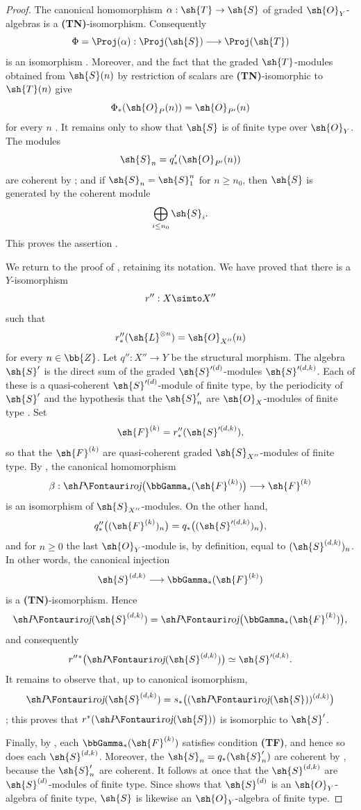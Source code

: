 \begin{proof}
The canonical homomorphism $\alpha:\sh{T}\to\sh{S}$ of graded $\sh{O}_Y$-algebras is a \textbf{(TN)}-isomorphism.
Consequently
\label{III.2.3.5.1}
\[
  \Phi=\Proj(\alpha):\Proj(\sh{S})\longrightarrow\Proj(\sh{T})
\]
is an isomorphism .
Moreover,  and the fact that the graded $\sh{T}$-modules obtained from $\sh{S}(n)$ by restriction of scalars are \textbf{(TN)}-isomorphic to $\sh{T}(n)$ give
\[
  \Phi_*(\sh{O}_P(n))=\sh{O}_{P'}(n)
\]
for every $n$ .
It remains only to show that $\sh{S}$ is of finite type over $\sh{O}_Y$.
The modules
\[
  \sh{S}_n=q'_*(\sh{O}_{P'}(n))
\]
are coherent by ; and if $\sh{S}_n=\sh{S}_1^n$ for $n\geq n_0$, then $\sh{S}$ is generated by the coherent module
\[
  \bigoplus_{i\leq n_0}\sh{S}_i.
\]
This proves the assertion .

We return to the proof of , retaining its notation.
We have proved that there is a $Y$-isomorphism
\[
  r'':X\simto X''
\]
such that
\[
  r''_*(\sh{L}^{\otimes n})=\sh{O}_{X''}(n)
\]
for every $n\in\bb{Z}$.
Let $q'':X''\to Y$ be the structural morphism.
The algebra $\sh{S}'$ is the direct sum of the graded $\sh{S}'^{(d)}$-modules $\sh{S}'^{(d,k)}$.
Each of these is a quasi-coherent $\sh{S}'^{(d)}$-module of finite type, by the periodicity of $\sh{S}'$ and the hypothesis that the $\sh{S}'_n$ are $\sh{O}_X$-modules of finite type .
Set
\[
  \sh{F}^{(k)}=r''_*(\sh{S}'^{(d,k)}),
\]
so that the $\sh{F}^{(k)}$ are quasi-coherent graded $\sh{S}_{X''}$-modules of finite type.
By , the canonical homomorphism
\[
  \beta:\shProj\bigl(\bbGamma_*(\sh{F}^{(k)})\bigr)
  \longrightarrow\sh{F}^{(k)}
\]
is an isomorphism of $\sh{S}_{X''}$-modules.
On the other hand,
\[
  q''_*\bigl((\sh{F}^{(k)})_n\bigr)
  =q_*\bigl((\sh{S}'^{(d,k)})_n\bigr),
\]
and for $n\geq0$ the last $\sh{O}_Y$-module is, by definition, equal to $(\sh{S}^{(d,k)})_n$.
In other words, the canonical injection
\[
  \sh{S}^{(d,k)}
  \longrightarrow\bbGamma_*(\sh{F}^{(k)})
\]
is a \textbf{(TN)}-isomorphism.
Hence
\[
  \shProj(\sh{S}^{(d,k)})
  =\shProj\bigl(\bbGamma_*(\sh{F}^{(k)})\bigr),
\]
and consequently
\[
  r''{}^*\bigl(\shProj(\sh{S}^{(d,k)})\bigr)
  \simeq\sh{S}'^{(d,k)}.
\]
It remains to observe that, up to canonical isomorphism,
\[
  \shProj(\sh{S}^{(d,k)})
  =s_*\bigl((\shProj(\sh{S}))^{(d,k)}\bigr)
\]
; this proves that $r^*(\shProj(\sh{S}))$ is isomorphic to $\sh{S}'$.

Finally, by , each $\bbGamma_*(\sh{F}^{(k)})$ satisfies condition \textbf{(TF)}, and hence so does each $\sh{S}^{(d,k)}$.
Moreover, the $\sh{S}_n=q_*(\sh{S}'_n)$ are coherent by , because the $\sh{S}'_n$ are coherent.
It follows at once that the $\sh{S}^{(d,k)}$ are $\sh{S}^{(d)}$-modules of finite type.
Since  shows that $\sh{S}^{(d)}$ is an $\sh{O}_Y$-algebra of finite type, $\sh{S}$ is likewise an $\sh{O}_Y$-algebra of finite type.
\end{proof}

